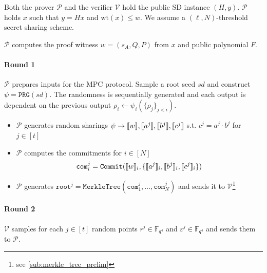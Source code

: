 \documentclass[11pt]{report}
\theoremstyle{definition}
\theoremstyle{plain}
\begin{document}
\begin{protocol}\label{def:sdith-zkpok}
  \setlength{\parskip}{5pt}
  \setlength{\parindent}{0pt}
  \titlespacing*{\paragraph}{0pt}{1pt}{1em}
  Both the prover $\mathcal{P}$ and the verifier $\mathcal{V}$ hold the public SD instance $(H,y)$. $\mathcal{P}$ holds $x$ such that $y = Hx$ and $\text{wt}(x) \leq w$. We assume a $(\ell, N)$-threshold secret sharing scheme.

  $\mathcal{P}$ computes the proof witness $w = (s_A, Q, P)$ from $x$ and public polynomial $F$.

  \paragraph{Round 1}
  $\mathcal{P}$ prepares inputs for the MPC protocol. Sample a root seed $sd$ and construct $\psi = \texttt{PRG}(sd)$. The randomness is sequentially generated and each output is dependent on the previous output $\rho_i \leftarrow \psi_i(\{\rho_j\}_{j < i})$.

  \begin{itemize}[parsep=0pt, itemsep=0pt, topsep=0pt]
    \item $\mathcal{P}$ generates random sharings $\psi \rightarrow \llbracket w \rrbracket, \llbracket a^j \rrbracket, \llbracket b^j \rrbracket, \llbracket c^j \rrbracket$ s.t. $c^j = a^j \cdot b^j$ for $j \in [t]$
    \item $\mathcal{P}$ computes the commitments for $i \in [N]$
          \begin{align*}
            \texttt{com}^j_i = \texttt{Commit}(\llbracket w \rrbracket_i, \{ \llbracket a^j \rrbracket_i, \llbracket b^j \rrbracket_i, \llbracket c^j \rrbracket_i \})
          \end{align*}
    \item $\mathcal{P}$ generates $\texttt{root}^j = \texttt{MerkleTree}(\texttt{com}^j_1, \ldots, \texttt{com}^j_N)$ and sends it to $\mathcal{V}$\footnote{see \autoref{sub:merkle_tree_prelim}}
  \end{itemize}

  \paragraph{Round 2}
  $\mathcal{V}$ samples for each $j \in [t]$ random points $r^j \in \mathbb{F}_{q^4}$ and $\varepsilon^j \in \mathbb{F}_{q^4}$ and sends them to $\mathcal{P}$.


\end{protocol}
\end{document}
